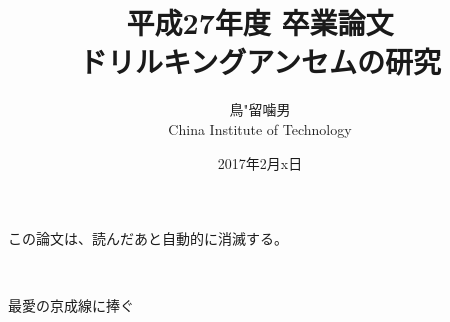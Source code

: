 \documentclass[a4paper,11pt]{jsbook}
\begin{document}
\title{平成27年度 卒業論文\\
ドリルキングアンセムの研究}

\author{鳥"留噛男 \\
China Institute of Technology}

\date{2017年2月x日}

\maketitle

この論文は、読んだあと自動的に消滅する。
\clearpage

\pagestyle{plain}
\vfil
\ \\
\vspace{15em}
\begin{center}
	{\Large 最愛の京成線に捧ぐ }
\end{center}




\tableofcontents



\cleardoublepage
{}






\appendix





\newpage
\printindex
\end{document}
